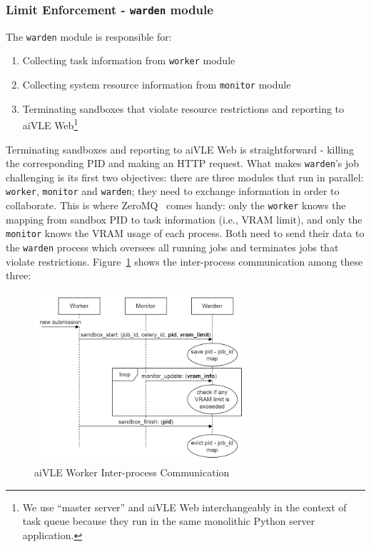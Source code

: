 \subsubsection{Limit Enforcement - \texttt{warden} module}
\label{sss:warden}
The \texttt{warden} module is responsible for:
\begin{enumerate}
    \item Collecting task information from \texttt{worker} module
    \item Collecting system resource information from \texttt{monitor} module
    \item Terminating sandboxes that violate resource restrictions and reporting to aiVLE Web\footnote{We use ``master server'' and aiVLE Web interchangeably in the context of task queue because they run in the same monolithic Python server application.}
\end{enumerate}

Terminating sandboxes and reporting to aiVLE Web is straightforward - killing the corresponding PID and making an HTTP request. What makes \texttt{warden}'s job challenging is its first two objectives: there are three modules that run in parallel: \texttt{worker}, \texttt{monitor} and \texttt{warden}; they need to exchange information in order to collaborate. This is where ZeroMQ~\parencite{zeromq} comes handy: only the \texttt{worker} knows the mapping from sandbox PID to task information (i.e., VRAM limit), and only the \texttt{monitor} knows the VRAM usage of each process. Both need to send their data to the \texttt{warden} process which oversees all running jobs and terminates jobs that violate restrictions. Figure~\ref{fig:aivle-worker-ipc} shows the inter-process communication among these three:

\begin{figure}[H]
    \centering
    \includegraphics[width=0.7\textwidth]{images/aivle-worker-ipc.png}
    \caption{aiVLE Worker Inter-process Communication}
    \label{fig:aivle-worker-ipc}
\end{figure}


